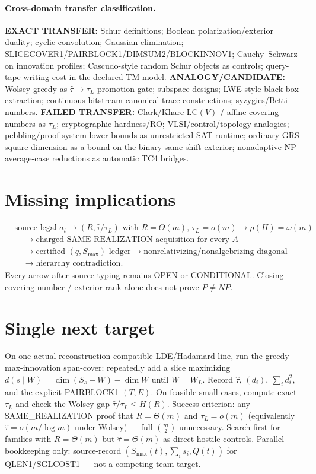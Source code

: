 \documentclass[11pt]{article}
\begin{document}
\paragraph{Cross-domain transfer classification.}
\textbf{EXACT TRANSFER:} Schur definitions; Boolean polarization/exterior duality; cyclic convolution;
Gaussian elimination; SLICECOVER1/PAIRBLOCK1/DIMSUM2/BLOCKINNOV1; Cauchy--Schwarz on innovation
profiles; Cascudo-style random Schur objects as controls; query-tape writing cost in the declared TM model.
\textbf{ANALOGY/CANDIDATE:} Wolsey greedy as $\widehat\tau\to\tau_L$ promotion gate; subspace designs;
LWE-style black-box extraction; continuous-bitstream canonical-trace constructions; syzygies/Betti numbers.
\textbf{FAILED TRANSFER:} Clark/Khare $\mathrm{LC}(V)$ / affine covering numbers as $\tau_L$;
cryptographic hardness/RO; VLSI/control/topology analogies; pebbling/proof-system lower bounds as
unrestricted SAT runtime; ordinary GRS square dimension as a bound on the binary same-shift exterior;
nonadaptive NP average-case reductions as automatic TC4 bridges.

\section*{Missing implications}
\[
\begin{aligned}
&\text{source-legal }a_t
\to (R,\widehat\tau/\tau_L)\text{ with }R=\Theta(m),\,\tau_L=o(m)
\to \rho(H)=\omega(m)\\
&\quad\to\text{charged SAME\_REALIZATION acquisition for every }A\\
&\quad\to\text{certified }(q,S_{\max})\text{ ledger}
\to\text{nonrelativizing/nonalgebrizing diagonal}\\
&\quad\to\text{hierarchy contradiction}.
\end{aligned}
\]
Every arrow after source typing remains OPEN or CONDITIONAL. Closing covering-number / exterior
rank alone does not prove $P\neq NP$.

\section*{Single next target}
On one actual reconstruction-compatible LDE/Hadamard line, run the greedy max-innovation
span-cover: repeatedly add a slice maximizing $d(s\mid W)=\dim(S_s+W)-\dim W$ until $W=W_L$.
Record $\widehat\tau$, $(d_i)$, $\sum_i d_i^2$, and the explicit PAIRBLOCK1 $(T,E)$.
On feasible small cases, compute exact $\tau_L$ and check the Wolsey gap
$\widehat\tau/\tau_L\le H(R)$. Success criterion: any SAME\_REALIZATION proof that
$R=\Theta(m)$ and $\tau_L=o(m)$ (equivalently $\widehat\tau=o(m/\log m)$ under Wolsey)
--- full $\binom{m}{2}$ unnecessary. Search first for families with $R=\Theta(m)$ but
$\widehat\tau=\Theta(m)$ as direct hostile controls. Parallel bookkeeping only: source-record
$(S_{\max}(t),\sum_i s_i,Q(t))$ for QLEN1/SGLCOST1 --- not a competing team target.
\end{document}
